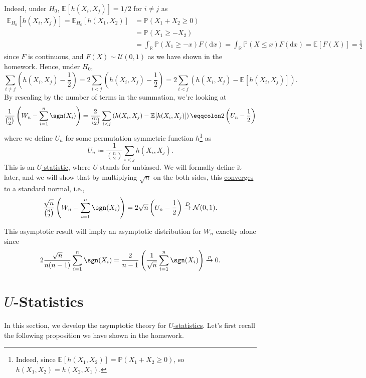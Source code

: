 Indeed, under \(H_0\), \(\mathbb{E}_{}[h(X_i, X_j)] = 1 / 2\) for \(i \neq j\) as
\[
	\begin{split}
		\mathbb{E}_{H_0}[h(X_i, X_j)]
		= \mathbb{E}_{H_0}[h(X_1, X_2)]
		 & = \mathbb{P} (X_1 + X_2 \geq 0)                             \\
		 & = \mathbb{P} (X_1 \geq -X_2)                                \\
		 & = \int _\mathbb{R} \mathbb{P} (X_1 \geq -x) F(\mathrm{d} x)
		= \int _\mathbb{R} \mathbb{P} (X \leq x) F(\mathrm{d} x)
		= \mathbb{E}_{}[F(X)]
		= \frac{1}{2}
	\end{split}
\]
since \(F\) is continuous, and \(F(X) \sim \mathcal{U} (0, 1)\) as we have shown in the homework. Hence, under \(H_0\),
\[
	\sum_{i \neq j} \left( h(X_i, X_j) - \frac{1}{2} \right)
	= 2 \sum_{i < j} \left( h(X_i, X_j) - \frac{1}{2} \right)
	= 2 \sum_{i < j} \left( h(X_i, X_j) - \mathbb{E}_{}[h(X_i, X_j)] \right).
\]
By rescaling by the number of terms in the summation, we're looking at
\[
	\frac{1}{\binom{n}{2}} \left( W_n - \sum_{i=1}^{n} \sgn (X_i) \right)
	= \frac{2}{\binom{n}{2}} \sum_{i < j} \left( h(X_i, X_j) - \mathbb{E}_{}[h(X_i, X_j)] \right)
	\eqqcolon 2 \left( U_n - \frac{1}{2} \right)
\]
where we define \(U_n\) for some permutation symmetric function \(h\)\footnote{Indeed, since \(\mathbb{E}_{}[h(X_1, X_2)] = \mathbb{P} (X_1 + X_2 \geq 0)\), so \(h(X_1, X_2) = h(X_2, X_1)\).} as
\[
	U_n \coloneqq \frac{1}{\binom{n}{2}} \sum_{i < j} h(X_i, X_j).
\]
This is an \hyperref[def:U-statistic]{\(U\)-statistic}, where \(U\) stands for unbiased. We will formally define it later, and we will show that by multiplying \(\sqrt{n} \) on the both sides, this \hyperref[def:converge-in-distribution]{converges} to a standard normal, i.e.,
\begin{equation}\label{eq:Wilcoxon-signed-rank-test}
	\frac{\sqrt{n}}{\binom{n}{2}}  \left( W_n - \sum_{i=1}^{n} \sgn (X_i) \right)
	= 2 \sqrt{n} \left( U_n - \frac{1}{2} \right)
	\overset{D}{\to} \mathcal{N} (0, 1).
\end{equation}

\begin{note}
	This asymptotic result will imply an asymptotic distribution for \(W_n\) exactly alone since
	\[
		2 \frac{\sqrt{n} }{n(n-1)} \sum_{i=1}^{n} \sgn (X_i)
		= \frac{2}{n-1} \left( \frac{1}{\sqrt{n} } \sum_{i=1}^{n} \sgn (X_i) \right)
		\overset{p}{\to} 0.
	\]
\end{note}

\section{\(U\)-Statistics}
In this section, we develop the asymptotic theory for \hyperref[def:U-statistic]{\(U\)-statistics}. Let's first recall the following proposition we have shown in the homework.

